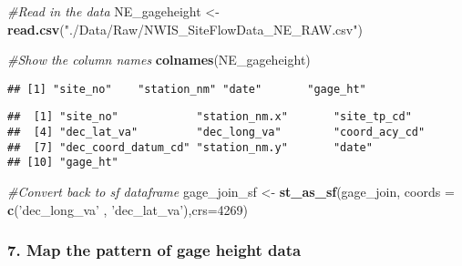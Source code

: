 \documentclass[]{article}
\newenvironment{Shaded}{\begin{snugshade}}{\end{snugshade}}
\newcommand{\KeywordTok}[1]{\textcolor[rgb]{0.13,0.29,0.53}{\textbf{#1}}}
\newcommand{\DataTypeTok}[1]{\textcolor[rgb]{0.13,0.29,0.53}{#1}}
\newcommand{\DecValTok}[1]{\textcolor[rgb]{0.00,0.00,0.81}{#1}}
\newcommand{\StringTok}[1]{\textcolor[rgb]{0.31,0.60,0.02}{#1}}
\newcommand{\CommentTok}[1]{\textcolor[rgb]{0.56,0.35,0.01}{\textit{#1}}}
\newcommand{\OperatorTok}[1]{\textcolor[rgb]{0.81,0.36,0.00}{\textbf{#1}}}
\newcommand{\NormalTok}[1]{#1}
\begin{document}
\begin{Shaded}
\begin{Highlighting}[]
\CommentTok{#Read in the data}
\NormalTok{NE_gageheight <-}\StringTok{ }\KeywordTok{read.csv}\NormalTok{(}\StringTok{"./Data/Raw/NWIS_SiteFlowData_NE_RAW.csv"}\NormalTok{)}

\CommentTok{#Show the column names}
\KeywordTok{colnames}\NormalTok{(NE_gageheight)}
\end{Highlighting}
\end{Shaded}

\begin{verbatim}
## [1] "site_no"    "station_nm" "date"       "gage_ht"
\end{verbatim}

\begin{Shaded}
\end{Shaded}

\begin{verbatim}
##  [1] "site_no"            "station_nm.x"       "site_tp_cd"        
##  [4] "dec_lat_va"         "dec_long_va"        "coord_acy_cd"      
##  [7] "dec_coord_datum_cd" "station_nm.y"       "date"              
## [10] "gage_ht"
\end{verbatim}

\begin{Shaded}
\begin{Highlighting}[]
\CommentTok{#Convert back to sf dataframe}
\NormalTok{gage_join_sf <-}\StringTok{ }\KeywordTok{st_as_sf}\NormalTok{(gage_join, }\DataTypeTok{coords =} \KeywordTok{c}\NormalTok{(}\StringTok{'dec_long_va'}\NormalTok{ , }\StringTok{'dec_lat_va'}\NormalTok{),}\DataTypeTok{crs=}\DecValTok{4269}\NormalTok{)}
\end{Highlighting}
\end{Shaded}

\subsubsection{7. Map the pattern of gage height
data}\label{map-the-pattern-of-gage-height-data}
\end{document}
